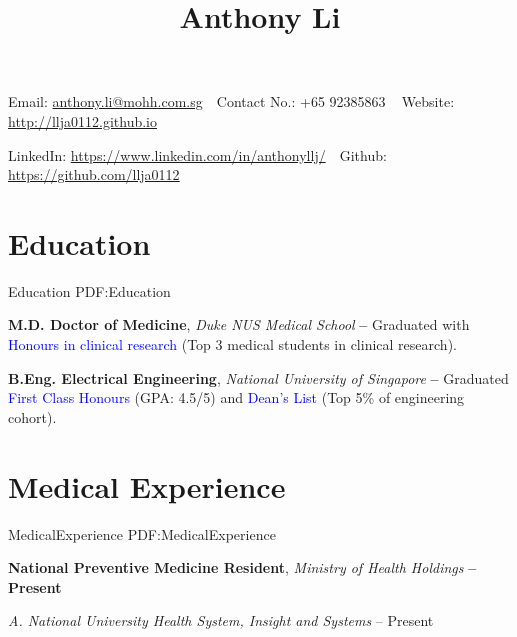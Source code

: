 \documentclass[letterpaper,10pt,oneside]{article}
\newcommand{\CVAuthor}{Anthony Li}
\newcommand{\CVWebpage}{http://llja0112.github.io}
\begin{document}

\title{\CVAuthor}

\begin{subtitle}
Email:
\href{mailto:anthony.li@mohh.com.sg}
{anthony.li@mohh.com.sg}
\,\SubBulletSymbol\,
Contact No.: +65 92385863\,
\,\SubBulletSymbol\,
Website: 
\href{\CVWebpage}
{\CVWebpage}
\par
LinkedIn: 
\href{https://www.linkedin.com/in/anthonyllj/}{https://www.linkedin.com/in/anthonyllj/}
\,\SubBulletSymbol\,
Github: \href{https://github.com/llja0112}{https://github.com/llja0112}
\end{subtitle}

\begin{body}


\section
{Education}
{Education}
{PDF:Education}

{\textbf{M.D. Doctor of Medicine}, \textit{Duke NUS Medical School}}
\hfill
\textbf{
 -- 
}
\BulletItem
Graduated with \textcolor{blue}{Honours in clinical research} (Top 3 medical students in clinical research). 

\BigGap
{\textbf{B.Eng. Electrical Engineering}, \textit{National University of Singapore}}
\hfill
\textbf{
 --
}
\GapNoBreak
\BulletItem
Graduated \textcolor{blue}{First Class Honours} (GPA: 4.5/5) and \textcolor{blue}{Dean's List} (Top 5\% of engineering cohort).

\section
{Medical Experience}
{MedicalExperience}
{PDF:MedicalExperience}

{\textbf{National Preventive Medicine Resident}, \textit{Ministry of Health Holdings}}
\hfill
\textbf{
 --
Present
}

\textit{A. National University Health System, Insight and Systems}
\hfill
{} --
Present


\end{body}
\end{document}
